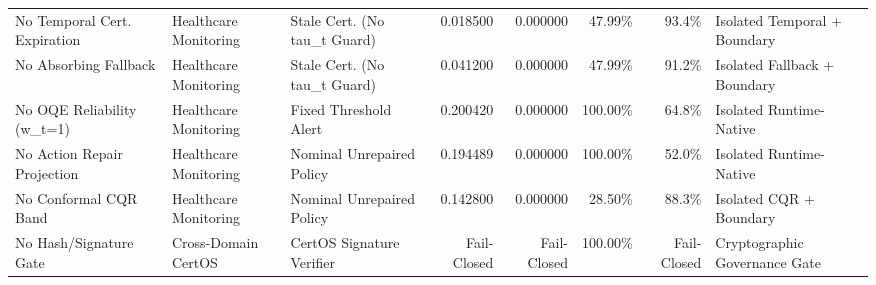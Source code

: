 \begin{table}[htbp]
{\begin{tabular}{lllrrrrl}
No Temporal Cert. Expiration & Healthcare Monitoring & Stale Cert. (No tau\_t Guard) & 0.018500 & 0.000000 & 47.99\% & 93.4\% & Isolated Temporal + Boundary\\
No Absorbing Fallback & Healthcare Monitoring & Stale Cert. (No tau\_t Guard) & 0.041200 & 0.000000 & 47.99\% & 91.2\% & Isolated Fallback + Boundary\\
No OQE Reliability (w\_t=1) & Healthcare Monitoring & Fixed Threshold Alert & 0.200420 & 0.000000 & 100.00\% & 64.8\% & Isolated Runtime-Native\\
No Action Repair Projection & Healthcare Monitoring & Nominal Unrepaired Policy & 0.194489 & 0.000000 & 100.00\% & 52.0\% & Isolated Runtime-Native\\
No Conformal CQR Band & Healthcare Monitoring & Nominal Unrepaired Policy & 0.142800 & 0.000000 & 28.50\% & 88.3\% & Isolated CQR + Boundary\\
No Hash/Signature Gate & Cross-Domain CertOS & CertOS Signature Verifier & Fail-Closed & Fail-Closed & 100.00\% & Fail-Closed & Cryptographic Governance Gate\\
\bottomrule
\end{tabular}}
\end{table}
